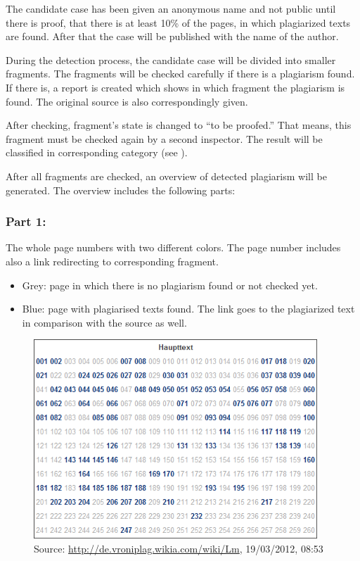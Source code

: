 The candidate case has been given an anonymous name and not public until there is proof, that there is at 
least 10\% of the pages, in which plagiarized texts are found. After that the case will be published with the 
name of the author.

During the detection process, the candidate case will be divided into smaller fragments. The fragments will be checked 
carefully if there is a plagiarism found. If there is, a report is created which shows in which fragment the 
plagiarism is found. The original source is also correspondingly given.

After checking, fragment’s state is changed to \enquote{to be proofed.} That means, this fragment must be checked again  by a 
second inspector. The result will be classified in corresponding category (see ).

After all fragments are checked, an overview of detected plagiarism will be generated. The overview includes the following 
parts:

\subsubsection{Part 1:} 

The whole page numbers with two different colors. The page number includes also a link redirecting to corresponding 
fragment.

\begin{itemize}
\item Grey: page in which there is no plagiarism found or not checked yet.
\item Blue: page with plagiarised texts found. The link goes to the plagiarized text in comparison with  the source as well.
\end{itemize}


\begin{figure}[!h]
  \centering
    \includegraphics[width=0.95\textwidth]{images/vroni-pages.png}
  \caption{Source: \url{http://de.vroniplag.wikia.com/wiki/Lm}, 19/03/2012, 08:53}
  \label{fig:vroniPages}
\end{figure}


